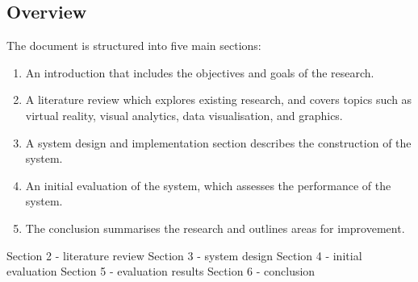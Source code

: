 \subsection{Overview}
The document is structured into five main sections:
\begin{enumerate}
    \item An introduction that includes the objectives and goals of the research. 
    \item A literature review which explores existing research, and covers topics such as virtual reality, visual analytics, data visualisation, and graphics. 
    \item A system design and implementation section describes the construction of the system. 
    \item An initial evaluation of the system, which assesses the performance of the system. 
    \item The conclusion summarises the research and outlines areas for improvement.
\end{enumerate}

Section 2 - literature review
Section 3 - system design
Section 4 - initial evaluation
Section 5 - evaluation results
Section 6 - conclusion